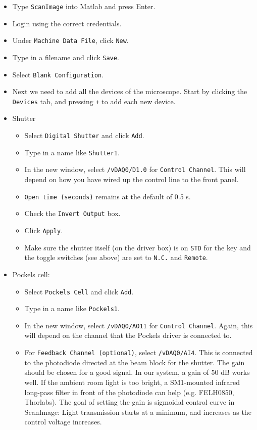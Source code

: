\documentclass[10pt,letterpaper]{article}
\begin{document}
\begin{itemize}
    \item Type \texttt{ScanImage} into Matlab and press Enter.
    \item Login using the correct credentials.
    \item Under \texttt{Machine Data File}, click \texttt{New}.
    \item Type in a filename and click \texttt{Save}.
    \item Select \texttt{Blank Configuration}.
    \item Next we need to add all the devices of the microscope. Start by clicking the \texttt{Devices} tab, and pressing \texttt{+} to add each new device.
    \item Shutter
    \begin{itemize}
        \item Select \texttt{Digital Shutter} and click \texttt{Add}.
        \item Type in a name like \texttt{Shutter1}.
        \item In the new window, select \texttt{/vDAQ0/D1.0} for \texttt{Control Channel}. This will depend on how you have wired up the control line to the front panel.
        \item \texttt{Open time (seconds)} remains at the default of 0.5 s.
        \item Check the \texttt{Invert Output} box.
        \item Click \texttt{Apply}.
        \item Make sure the shutter itself (on the driver box) is on \texttt{STD} for the key and the toggle switches (see above) are set to \texttt{N.C.} and \texttt{Remote}.
    \end{itemize}
    \item Pockels cell:
    \begin{itemize}
        \item Select \texttt{Pockels Cell} and click \texttt{Add}.
        \item Type in a name like \texttt{Pockels1}.
        \item In the new window, select \texttt{/vDAQ0/AO11} for \texttt{Control Channel}. Again, this will depend on the channel that the Pockels driver is connected to.
        \item For \texttt{Feedback Channel (optional)}, select \texttt{/vDAQ0/AI4}. This is connected to the photodiode directed at the beam block for the shutter. The gain should be chosen for a good signal. In our system, a gain of 50 dB works well. If the ambient room light is too bright, a SM1-mounted infrared long-pass filter in front of the photodiode can help (e.g. FELH0850, Thorlabs). The goal of setting the gain is sigmoidal control curve in ScanImage: Light transmission starts at a minimum, and increases as the control voltage increases.

\end{itemize}
\end{itemize}
\end{document}

